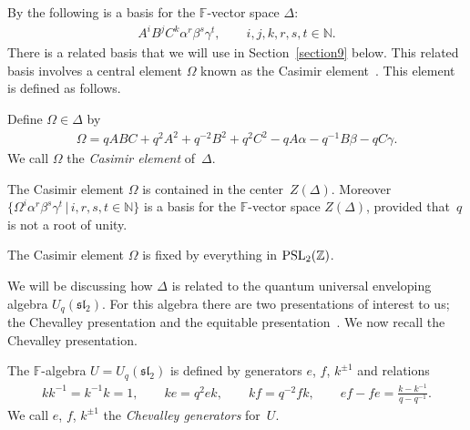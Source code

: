 By \cite[Theorem~4.1]{uaw} the following
is a basis for the $\mathbb F$-vector space $\Delta$:
\begin{gather*}
 A^iB^jC^k \alpha^r\beta^s\gamma^t,
\qquad
i,j,k,r,s,t \in \mathbb N.
\end{gather*}
There is a related basis
\cite[Theorem~7.5]{uaw} that we will use
 in
Section~\ref{section9} below. This related basis
involves
 a
central element $\Omega$ known as the Casimir
element~\cite[Lemma~6.1]{uaw}.
This element is def\/ined
as follows.


\begin{Definition}
\label{def:casdelta}
Def\/ine $\Omega \in \Delta$ by
\begin{gather*}
\Omega = qABC+q^2A^2+q^{-2}B^2+q^2 C^2 - q A\alpha  - q^{-1} B \beta
- q C \gamma.
\end{gather*}
We call $\Omega$ the {\it Casimir element} of~$\Delta$.
\end{Definition}

\begin{Lemma}
The Casimir element $\Omega$ is contained in the
center~$Z(\Delta)$.
Moreover
$\lbrace \Omega^i\alpha^r\beta^s\gamma^t \,|\, i,r,s,t \in \mathbb N\rbrace$
is a basis for
the $\mathbb F$-vector space
$Z(\Delta)$,
provided that~$q$ is not a root of unity.
\end{Lemma}

\begin{Lemma}
\label{lem:psl}
The Casimir element $\Omega$  is fixed by
everything in
${\rm  {PSL}}_2(\mathbb Z)$.
\end{Lemma}

We will be discussing how
$\Delta$ is related to the
quantum universal enveloping
algebra $U_q(\mathfrak{sl}_2)$.
For
this algebra
there are two presentations of
 interest to us;
 the Chevalley presentation
\cite[Section~1.1]{jantzen}
and the equitable presentation~\cite{equit}. We now recall the
  Chevalley presentation.


\begin{Definition}
\label{def:chev}
The
$\mathbb F$-algebra $U=U_q(\mathfrak{sl}_2)$
is def\/ined by generators
$e$, $f$, $k^{\pm 1 }$  and relations
\begin{gather*}
  k k^{-1} = k^{-1} k = 1,
\qquad
 ke = q^2 e k,
\qquad
 kf = q^{-2} f k,
\qquad ef-fe = \frac{k-k^{-1}}{q-q^{-1}}.
\end{gather*}
We call  $e$, $f$, $k^{\pm 1}$ the {\it Chevalley generators} for~$U$.
\end{Definition}

